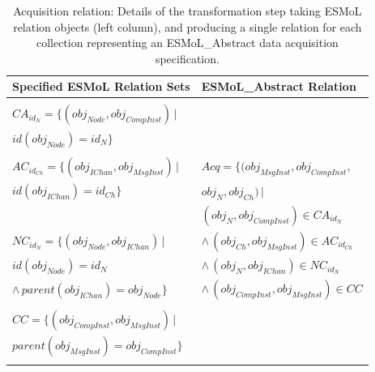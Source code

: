 \begin{table}
\centering

\begin{tabular}[width=0.5\columnwidth]{ | l | l | }
 \hline
 \textbf{Specified ESMoL Relation Sets} & \textbf{ESMoL\_Abstract Relation} \\
 \hline \hline
                                                                        & \\
 $CA_{id_N} = \{ (obj_{Node}, obj_{CompInst} ) \, |$                    & \\
 \hspace{1.7cm} $ id(obj_{Node}) = id_N \} $                            & \\
                                                                        & \\
 $AC_{id_{Ch}} = \{ (obj_{IChan}, obj_{MsgInst} ) \, |$                 & 
$ Acq = \{(obj_{MsgInst}, obj_{CompInst}, $  \\
 \hspace{1.6cm} $id(obj_{IChan}) = id_{Ch} \} $                         & 
\hspace{1.3cm} $obj_{N}, obj_{Ch}) \, |$ \\
                                                                        &  
\hspace{0.8cm} $(obj_{N}, obj_{CompInst}) \in CA_{id_N}$ \\
 $NC_{id_N} = \{ (obj_{Node}, obj_{IChan}) \, | $                       & 
\hspace{0.5cm} $ \wedge \, (obj_{Ch}, obj_{MsgInst}) \in AC_{id_{Ch}}$ \\
 \hspace{1.35cm} $id(obj_{Node}) = id_N $                                &
\hspace{0.5cm} $ \wedge \, (obj_{N}, obj_{IChan}) \in NC_{id_N}$ \\ 
 \hspace{1cm} $ \wedge \, parent(obj_{IChan} ) = obj_{Node} \}$       &
\hspace{0.5cm} $ \wedge \, (obj_{CompInst}, obj_{MsgInst}) \in CC $ \\
                                                                        & \\
 $CC = \{ (obj_{CompInst}, obj_{MsgInst} ) \, | $                       & \\
 \hspace{0.7cm} $parent(obj_{MsgInst} ) = obj_{CompInst} \}$            & \\ 
                                                                        & \\
 \hline
\end{tabular}
	\caption{Acquisition relation: Details of the transformation step taking ESMoL
relation objects (left column), and producing a single relation for each
collection representing an ESMoL\_Abstract data acquisition specification.}
	\label{tab:acquisition}
\end{table}


